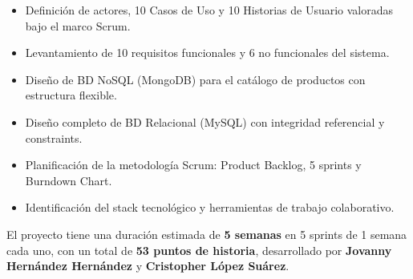 \documentclass[12pt,a4paper]{article}
\begin{document}
\begin{itemize}[label={$\bullet$}]
  \item Definición de actores, 10 Casos de Uso y 10 Historias de Usuario valoradas bajo el marco Scrum.
  \item Levantamiento de 10 requisitos funcionales y 6 no funcionales del sistema.
  \item Diseño de BD NoSQL (MongoDB) para el catálogo de productos con estructura flexible.
  \item Diseño completo de BD Relacional (MySQL) con integridad referencial y constraints.
  \item Planificación de la metodología Scrum: Product Backlog, 5 sprints y Burndown Chart.
  \item Identificación del stack tecnológico y herramientas de trabajo colaborativo.
\end{itemize}

El proyecto tiene una duración estimada de \textbf{5 semanas} en 5 sprints de 1 semana cada uno,
con un total de \textbf{53 puntos de historia}, desarrollado por
\textbf{Jovanny Hernández Hernández} y \textbf{Cristopher López Suárez}.
\end{document}
